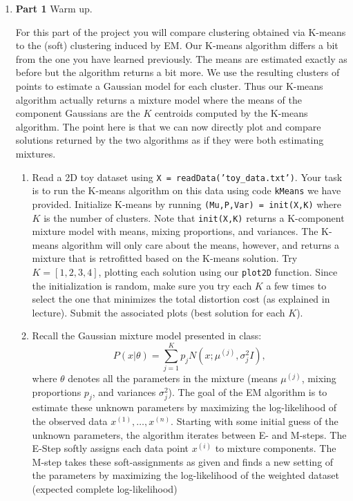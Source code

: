 \begin{enumerate}

\item {\bf Part 1} Warm up.

For this part of the project you will compare clustering obtained via K-means to the (soft) clustering induced by EM. Our K-means algorithm differs a bit from the one you have learned previously. The means are estimated exactly as before but the algorithm returns a bit more. We 
use the resulting clusters of points to estimate a Gaussian model for each cluster. Thus our K-means algorithm actually returns a mixture model where the means of the component Gaussians are the $K$ centroids computed by the K-means algorithm. The point here is that we can now directly plot and compare solutions returned by the two algorithms as if they were both estimating mixtures. 


\begin{enumerate}
  \item Read a 2D toy dataset using \texttt{X = readData('toy\_data.txt')}. Your task is to run the K-means algorithm on this data using code \texttt{kMeans} we have provided. Initialize K-means by running \texttt{(Mu,P,Var) = init(X,K)} where $K$ is the number of clusters. Note that \texttt{init(X,K)} returns a K-component mixture model with means, mixing proportions, and variances. The K-means algorithm will only care about the means, however, and returns a mixture that is retrofitted based on the K-means solution. Try $K= [1,2,3,4]$, plotting each solution using our \texttt{plot2D} function. Since the initialization is random, make sure you try each $K$ a few times to select the one that minimizes the total distortion cost (as explained in lecture). Submit the associated plots (best solution for each $K$).

  \item 
  Recall the Gaussian mixture model presented in class:
  $$P(x | \theta) = \sum^{K}_{j=1} p_j  N(x;\mu^{(j)},\sigma_j^2I),$$
 where $\theta$ denotes all the parameters in the mixture (means $\mu^{(j)}$, mixing proportions $p_j$, and variances $\sigma^2_j$). The goal of the EM algorithm is to estimate these unknown parameters by maximizing the log-likelihood of the observed data $x^{(1)},\ldots, x^{(n)}$. Starting with some initial guess of the unknown parameters, the algorithm iterates between E- and M-steps. The E-Step softly assigns each data point $x^{(i)}$ to mixture components. The M-step takes these soft-assignments as given and finds a new setting of the parameters by maximizing the log-likelihood of the weighted dataset (expected complete log-likelihood)


\end{enumerate}
\end{enumerate}
